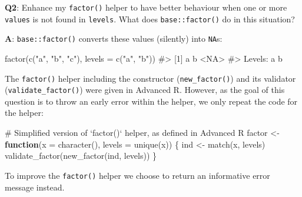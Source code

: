 \documentclass[
]{krantz}
\makeatletter
\newenvironment{Shaded}{\begin{snugshade}}{\end{snugshade}}
\newcommand{\CommentTok}[1]{\textcolor[rgb]{0.56,0.35,0.01}{\textit{#1}}}
\newcommand{\ControlFlowTok}[1]{\textcolor[rgb]{0.13,0.29,0.53}{\textbf{#1}}}
\newcommand{\DataTypeTok}[1]{\textcolor[rgb]{0.13,0.29,0.53}{#1}}
\newcommand{\KeywordTok}[1]{\textcolor[rgb]{0.13,0.29,0.53}{\textbf{#1}}}
\newcommand{\NormalTok}[1]{#1}
\newcommand{\StringTok}[1]{\textcolor[rgb]{0.31,0.60,0.02}{#1}}
\newenvironment{kframe}{%
\medskip{}
\setlength{\fboxsep}{.8em}
 \def\at@end@of@kframe{}%
 \ifinner\ifhmode%
  \def\at@end@of@kframe{\end{minipage}}%
  \begin{minipage}{\columnwidth}%
 \fi\fi%
 \def\FrameCommand##1{\hskip\@totalleftmargin \hskip-\fboxsep
 \colorbox{shadecolor}{##1}\hskip-\fboxsep
     \hskip-\linewidth \hskip-\@totalleftmargin \hskip\columnwidth}%
 \MakeFramed {\advance\hsize-\width
   \@totalleftmargin\z@ \linewidth\hsize
   \@setminipage}}%
 {\par\unskip\endMakeFramed%
 \at@end@of@kframe}
\renewenvironment{Shaded}{\begin{kframe}}{\end{kframe}}
\renewcommand{\KeywordTok} [1]{\textcolor[rgb]{0.00,0.44,0.13}{{#1}}}
\renewcommand{\DataTypeTok}[1]{\textcolor[rgb]{0.56,0.13,0.00}{{#1}}}
\renewcommand{\StringTok}  [1]{\textcolor[rgb]{0.25,0.44,0.63}{{#1}}}
\renewcommand{\CommentTok} [1]{\textcolor[rgb]{0.38,0.63,0.69}{{#1}}}
\renewcommand{\NormalTok}  [1]{{#1}}
\makeatother
\begin{document}
\textbf{{Q2}}: Enhance my \texttt{factor()} helper to have better behaviour when one or more \texttt{values} is not found in \texttt{levels}. What does \texttt{base::factor()} do in this situation?

\textbf{{A}}: \texttt{base::factor()} converts these values (silently) into \texttt{NA}s:

\begin{Shaded}
\begin{Highlighting}[]
\KeywordTok{factor}\NormalTok{(}\KeywordTok{c}\NormalTok{(}\StringTok{"a"}\NormalTok{, }\StringTok{"b"}\NormalTok{, }\StringTok{"c"}\NormalTok{), }\DataTypeTok{levels =} \KeywordTok{c}\NormalTok{(}\StringTok{"a"}\NormalTok{, }\StringTok{"b"}\NormalTok{))}
\CommentTok{#> [1] a    b    <NA>}
\CommentTok{#> Levels: a b}
\end{Highlighting}
\end{Shaded}

The \texttt{factor()} helper including the constructor (\texttt{new\_factor()}) and its validator (\texttt{validate\_factor()}) were given in Advanced R. However, as the goal of this question is to throw an early error within the helper, we only repeat the code for the helper:

\begin{Shaded}
\begin{Highlighting}[]
\CommentTok{# Simplified version of `factor()` helper, as defined in Advanced R}
\NormalTok{factor <-}\StringTok{ }\ControlFlowTok{function}\NormalTok{(}\DataTypeTok{x =} \KeywordTok{character}\NormalTok{(), }\DataTypeTok{levels =} \KeywordTok{unique}\NormalTok{(x)) \{}
\NormalTok{  ind <-}\StringTok{ }\KeywordTok{match}\NormalTok{(x, levels)}
  \KeywordTok{validate_factor}\NormalTok{(}\KeywordTok{new_factor}\NormalTok{(ind, levels))}
\NormalTok{\}}
\end{Highlighting}
\end{Shaded}

To improve the \texttt{factor()} helper we choose to return an informative error message instead.
\end{document}
